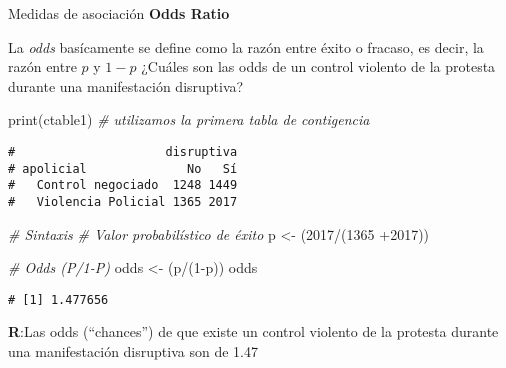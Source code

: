 \documentclass[
  8pt,
  ignorenonframetext,
]{beamer}
\newenvironment{Shaded}{\begin{snugshade}}{\end{snugshade}}
\newcommand{\CommentTok}[1]{\textcolor[rgb]{0.56,0.35,0.01}{\textit{#1}}}
\newcommand{\DecValTok}[1]{\textcolor[rgb]{0.00,0.00,0.81}{#1}}
\newcommand{\FunctionTok}[1]{\textcolor[rgb]{0.00,0.00,0.00}{#1}}
\newcommand{\NormalTok}[1]{#1}
\newcommand{\OtherTok}[1]{\textcolor[rgb]{0.56,0.35,0.01}{#1}}
\newcommand{\SpecialCharTok}[1]{\textcolor[rgb]{0.00,0.00,0.00}{#1}}
\begin{document}
\begin{frame}[fragile]{Medidas de asociación}
\protect\hypertarget{medidas-de-asociaciuxf3n-6}{}
\textbf{Odds Ratio}

La \emph{odds} basícamente se define como la razón entre éxito o
fracaso, es decir, la razón entre \(p\) y \(1-p\) ¿Cuáles son las odds
de un control violento de la protesta durante una manifestación
disruptiva?

\begin{Shaded}
\begin{Highlighting}[]
\FunctionTok{print}\NormalTok{(ctable1) }\CommentTok{\# utilizamos la primera tabla de contigencia}
\end{Highlighting}
\end{Shaded}

\begin{verbatim}
#                     disruptiva
# apolicial              No   Sí
#   Control negociado  1248 1449
#   Violencia Policial 1365 2017
\end{verbatim}

\begin{Shaded}
\begin{Highlighting}[]
\CommentTok{\# Sintaxis}
\CommentTok{\# Valor probabilístico de éxito}
\NormalTok{p }\OtherTok{\textless{}{-}}\NormalTok{ (}\DecValTok{2017}\SpecialCharTok{/}\NormalTok{(}\DecValTok{1365} \SpecialCharTok{+}\DecValTok{2017}\NormalTok{))}

\CommentTok{\# Odds (P/1{-}P)}
\NormalTok{odds }\OtherTok{\textless{}{-}}\NormalTok{ (p}\SpecialCharTok{/}\NormalTok{(}\DecValTok{1}\SpecialCharTok{{-}}\NormalTok{p)) }
\NormalTok{odds}
\end{Highlighting}
\end{Shaded}

\begin{verbatim}
# [1] 1.477656
\end{verbatim}

\textbf{R}:Las odds (``chances'') de que existe un control violento de
la protesta durante una manifestación disruptiva son de 1.47
\end{frame}
\end{document}
